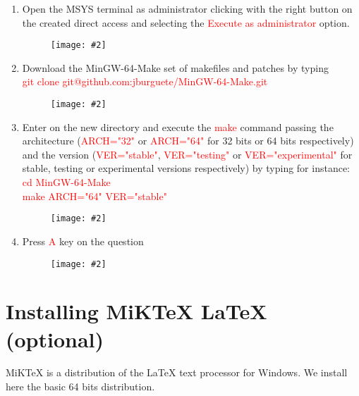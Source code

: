 \documentclass[a4paper]{article}
\newcommand{\FIG}[2]
{
	\begin{figure}[ht!]
	\centering
	\texttt{[image: \#2]}
	\end{figure}
}
\newcommand{\FIGURE}[1]{\FIG{0.35}{#1}}
\newcommand{\RED}[1] {\textcolor{red}{#1}}
\begin{document}
\begin{enumerate}

\clearpage

\item Open the MSYS terminal as administrator clicking with the right button on
the created direct access and selecting the \RED{Execute as administrator}
option.
\FIGURE{mingw-1.png.eps}

\item Download the MinGW-64-Make set of makefiles and patches by typing\\
\RED{git clone git@github.com:jburguete/MinGW-64-Make.git}
\FIGURE{mingw-2.png.eps}

\clearpage

\item Enter on the new directory and execute the \RED{make} command passing the
architecture (\RED{ARCH="32"} or \RED{ARCH="64"} for 32 bits or 64 bits
respectively) and the version (\RED{VER="stable"}, \RED{VER="testing"} or
\newline\RED{VER="experimental"} for stable, testing or experimental versions
respectively) by typing for instance:\\
\RED{cd MinGW-64-Make}\\
\RED{make ARCH="64" VER="stable"}
\FIGURE{mingw-3.png.eps}

\item Press \RED{A} key on the question
\FIGURE{mingw-4.png.eps}

\end{enumerate}

\clearpage

\section{Installing MiKTeX LaTeX (optional)}

MiKTeX is a distribution of the LaTeX text processor for Windows. We install
here the basic 64 bits distribution.
\end{document}
